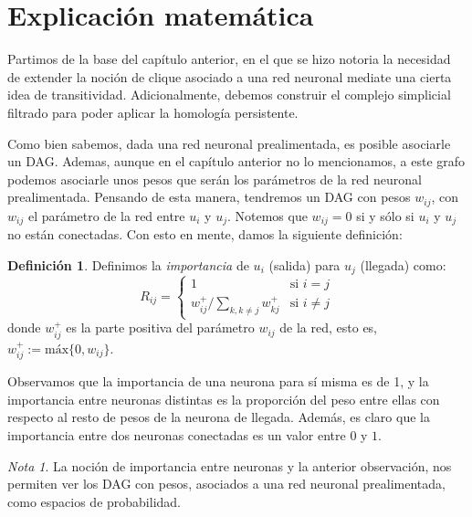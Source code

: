 \documentclass[12pt, a4paper, twoside]{book}
\numberwithin{equation}{section}
\theoremstyle{definition}
\newtheorem{defi}{Definición}
\theoremstyle{remark}
\newtheorem*{remark}{Nota}
\theoremstyle{plain}
\begin{document}
	\section{Explicación matemática}
	
	Partimos de la base del capítulo anterior, en el que se hizo notoria 
	la necesidad de extender la noción de clique asociado a una red 
	neuronal mediate una cierta idea de transitividad. Adicionalmente, 
	debemos construir el complejo simplicial filtrado para poder aplicar 
	la homología persistente.
	
	Como bien sabemos, dada una red neuronal prealimentada, es posible 
	asociarle un DAG. Ademas, aunque en el capítulo anterior no lo 
	mencionamos, a este grafo podemos asociarle unos pesos que serán los 
	parámetros de la red neuronal prealimentada. Pensando de esta manera, 
	tendremos un DAG con pesos $w_{ij}$, con $w_{ij}$ el parámetro de la 
	red entre $u_{i}$ y $u_{j}$. Notemos que $w_{ij}=0$ si y sólo si 
	$u_{i}$ y $u_{j}$ no están conectadas.
	Con esto en mente, damos la siguiente definición: 
	
	\begin{defi}
	Definimos la \textit{importancia} de $u_{i}$ (salida) para $u_{j}$ 
	(llegada) como:
	\begin{equation*}
		R_{ij}=  \left \{ 
			\begin{array}{ll}
				1 & \text{si } i=j \\
				w_{ij}^{+}/\sum_{k,k \neq j}w_{kj}^{+} & \text{si } i \neq j
			\end{array}
		\right. 
	\end{equation*}
	donde $w_{ij}^{+}$ es la parte positiva del parámetro $w_{ij}$ de la 
	red, esto es, $w_{ij}^{+}:=\text{máx}\{0,w_{ij}\}$. 
	\end{defi}
	Observamos que la importancia de una neurona para sí misma es de 1, y 
	la importancia entre neuronas distintas es la proporción del peso 
	entre ellas con respecto al resto de pesos de la neurona de llegada. 
	Además, es claro que la importancia entre dos neuronas conectadas es 
	un valor entre $0$ y $1$.

	\begin{remark}
		La noción de importancia entre neuronas y la anterior 
		observación, nos permiten ver los DAG con pesos, asociados a 
		una red neuronal prealimentada, como espacios de probabilidad.
	\end{remark}
\end{document}
